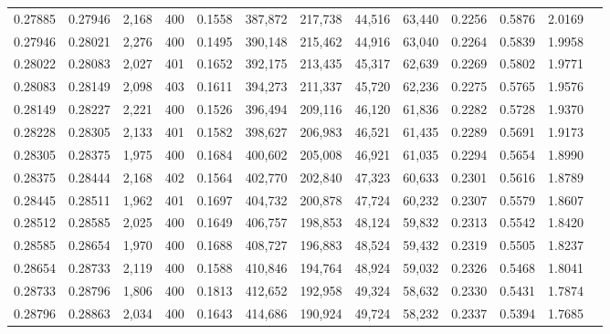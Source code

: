 \begin{tabular}{rrrrrrrrrrrrr}
0.27885 & 0.27946 &  2,168 & 400 &                                     0.1558 & 387,872 & 217,738 &  44,516 &  63,440 & 0.2256 & 0.5876 & 2.0169 \\
0.27946 & 0.28021 &  2,276 & 400 &                                     0.1495 & 390,148 & 215,462 &  44,916 &  63,040 & 0.2264 & 0.5839 & 1.9958 \\
0.28022 & 0.28083 &  2,027 & 401 &                                     0.1652 & 392,175 & 213,435 &  45,317 &  62,639 & 0.2269 & 0.5802 & 1.9771 \\
0.28083 & 0.28149 &  2,098 & 403 &                                     0.1611 & 394,273 & 211,337 &  45,720 &  62,236 & 0.2275 & 0.5765 & 1.9576 \\
0.28149 & 0.28227 &  2,221 & 400 &                                     0.1526 & 396,494 & 209,116 &  46,120 &  61,836 & 0.2282 & 0.5728 & 1.9370 \\
0.28228 & 0.28305 &  2,133 & 401 &                                     0.1582 & 398,627 & 206,983 &  46,521 &  61,435 & 0.2289 & 0.5691 & 1.9173 \\
0.28305 & 0.28375 &  1,975 & 400 &                                     0.1684 & 400,602 & 205,008 &  46,921 &  61,035 & 0.2294 & 0.5654 & 1.8990 \\
0.28375 & 0.28444 &  2,168 & 402 &                                     0.1564 & 402,770 & 202,840 &  47,323 &  60,633 & 0.2301 & 0.5616 & 1.8789 \\
0.28445 & 0.28511 &  1,962 & 401 &                                     0.1697 & 404,732 & 200,878 &  47,724 &  60,232 & 0.2307 & 0.5579 & 1.8607 \\
0.28512 & 0.28585 &  2,025 & 400 &                                     0.1649 & 406,757 & 198,853 &  48,124 &  59,832 & 0.2313 & 0.5542 & 1.8420 \\
0.28585 & 0.28654 &  1,970 & 400 &                                     0.1688 & 408,727 & 196,883 &  48,524 &  59,432 & 0.2319 & 0.5505 & 1.8237 \\
0.28654 & 0.28733 &  2,119 & 400 &                                     0.1588 & 410,846 & 194,764 &  48,924 &  59,032 & 0.2326 & 0.5468 & 1.8041 \\
0.28733 & 0.28796 &  1,806 & 400 &                                     0.1813 & 412,652 & 192,958 &  49,324 &  58,632 & 0.2330 & 0.5431 & 1.7874 \\
0.28796 & 0.28863 &  2,034 & 400 &                                     0.1643 & 414,686 & 190,924 &  49,724 &  58,232 & 0.2337 & 0.5394 & 1.7685 \\

\end{tabular}
